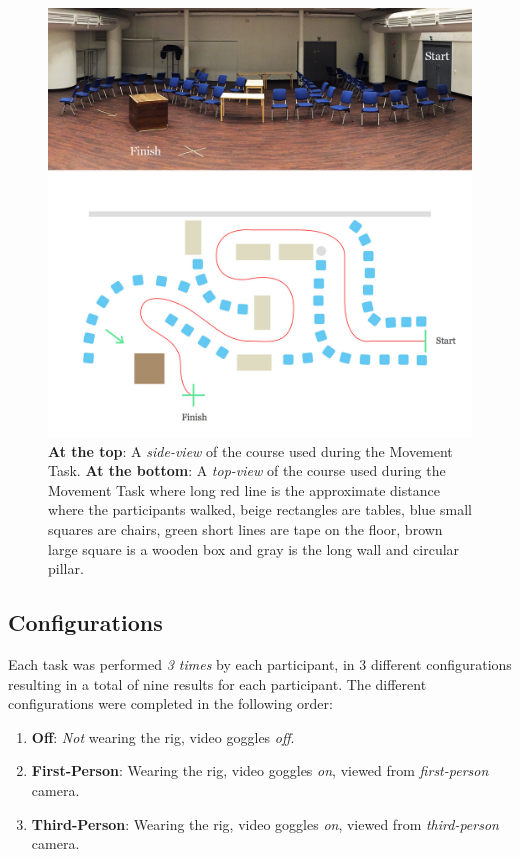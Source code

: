 \documentclass[runningheads,a4paper,oribibl]{llncs}
\begin{document}

\begin{figure}
   \centering
   \includegraphics[width=\textwidth]{ExternalMaterial/Course-top-side}
   \caption{\textbf{At the top}: A \emph{side-view} of the course used during the Movement Task. \textbf{At the bottom}: A \emph{top-view} of the course used during the Movement Task where long red line is the approximate distance where the participants walked, beige rectangles are tables, blue small squares are chairs, green short lines are tape on the floor, brown large square is a wooden box and gray is the long wall and circular pillar.} \label{fig:CourseTopSide}
\end{figure}








\subsection{Configurations} \label{subsubsec:Configurations}
Each task was performed \emph{3 times} by each participant, in 3 different configurations resulting in a total of nine results for each participant. The different configurations were completed in the following order:
\begin{enumerate}
	\item \textbf{Off}: \emph{Not} wearing the rig, video goggles \emph{off}.
	\item \textbf{First-Person}: Wearing the rig, video goggles \emph{on}, viewed from \emph{first-person} camera.
	\item \textbf{Third-Person}: Wearing the rig, video goggles \emph{on}, viewed from \emph{third-person} camera.
\end{enumerate} 
\end{document}
